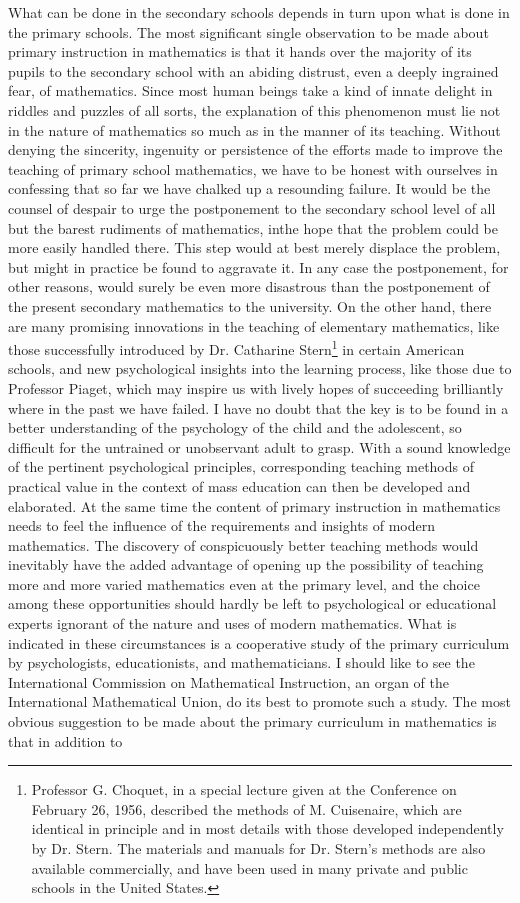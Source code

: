 What can be done in the secondary schools depends in turn upon what is done in the primary schools. The most significant single observation to be made about primary instruction in mathematics is that it hands over the majority of its pupils to the secondary school with an abiding distrust, even a deeply ingrained fear, of mathematics. Since most human beings take a kind of innate delight in riddles and puzzles of all sorts, the explanation of this phenomenon must lie not in the nature of mathematics so much as in the manner of its teaching. Without denying the sincerity, ingenuity or persistence of the efforts made to improve the teaching of primary school mathematics, we have to be honest with ourselves in confessing that so far we have chalked up a resounding failure. It would be the counsel of despair to urge the postponement to the secondary school level of all but the barest rudiments of mathematics, in\pageoriginale the hope that the problem could be more easily handled there. This step would at best merely displace the problem, but might in practice be found to aggravate it. In any case the postponement, for other reasons, would surely be even more disastrous than the postponement of the present secondary mathematics to the university. On the other hand, there are many promising innovations in the teaching of elementary mathematics, like those successfully introduced by Dr. Catharine Stern\footnote{Professor G. Choquet, in a special lecture given at the Conference on February 26, 1956, described the methods of M. Cuisenaire, which are identical in principle and in most details with those developed independently by Dr. Stern. The materials and manuals for Dr. Stern's methods are also available commercially, and have been used in many private and public schools in the United States.} in certain American schools, and new psychological insights into the learning process, like those due to Professor Piaget, which may inspire us with lively hopes of succeeding brilliantly where in the past we have failed. I have no doubt that the key is to be found in a better understanding of the psychology of the child and the adolescent, so difficult for the untrained or unobservant adult to grasp. With a sound knowledge of the pertinent psychological principles, corresponding teaching methods of practical value in the context of mass education can then be developed and elaborated. At the same time the content of primary instruction in mathematics needs to feel the influence of the requirements and insights of modern mathematics. The discovery of conspicuously better teaching methods would inevitably have the added advantage of opening up the possibility of teaching more and more varied mathematics even at the primary level, and the choice among these opportunities should hardly be left to psychological or educational experts ignorant of the nature and uses of modern mathematics. What is indicated in these circumstances is a cooperative study of the primary curriculum by psychologists, educationists, and mathematicians. I should like to see the International Commission on Mathematical Instruction, an organ of the International Mathematical Union, do its best to promote such a study. The most obvious suggestion to be made about the primary curriculum in mathematics is that in addition to 